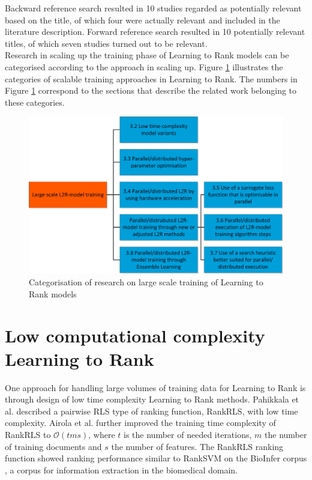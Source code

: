 Backward reference search resulted in 10 studies regarded as potentially relevant based on the title, of which four were actually relevant and included in the literature description. Forward reference search resulted in 10 potentially relevant titles, of which seven studies turned out to be relevant.\\

Research in scaling up the training phase of Learning to Rank models can be categorised according to the approach in scaling up. Figure \ref{fig:related_work_categories} illustrates the categories of scalable training approaches in Learning to Rank. The numbers in Figure \ref{fig:related_work_categories} correspond to the sections that describe the related work belonging to these categories.

\begin{figure}
\includegraphics{gfx/related_work_categories}
\caption{Categorisation of research on large scale training of  Learning to Rank models}
\label{fig:related_work_categories}
\end{figure}

\section{Low computational complexity Learning to Rank}
\label{sec:related_work_low_complexity}
One approach for handling large volumes of training data for Learning to Rank is through design of low time complexity Learning to Rank methods. Pahikkala et al. \cite{Pahikkala2009} described a pairwise \ac{RLS} type of ranking function, RankRLS, with low time complexity. Airola et al. \cite{Airola2010} further improved the training time complexity of RankRLS to $\mathcal{O}(tms)$, where $t$ is the number of needed iterations, $m$ the number of training documents and $s$ the number of features. The RankRLS ranking function showed ranking performance similar to Rank\acs{SVM} \cite{Herbrich1999, Joachims2002} on the BioInfer corpus \cite{Pyysalo2007}, a corpus for information extraction in the biomedical domain.\\

